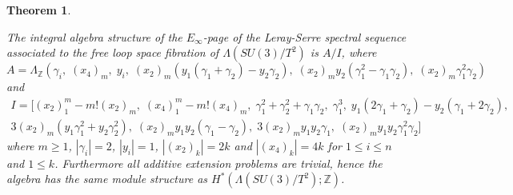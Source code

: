 \documentclass{article}
\theoremstyle{plain}
\newtheorem{thm}{Theorem}[section]
\theoremstyle{definition}
\numberwithin{thm}{section}
\begin{document}
			\begin{thm}\label{thm:L(SU(3)/T^2)}
				
				The integral algebra structure of the $E_\infty$-page of the Leray-Serre spectral sequence associated to the free loop space fibration of $\Lambda(SU(3)/T^2)$
				is $A/I$, where
				\begin{equation*}
					A=\Lambda_{\mathbb{Z}}(\gamma_i,\; (x_4)_m,\; y_i,\; (x_2)_m(y_1(\gamma_1+\gamma_2)-y_2\gamma_2),\; (x_2)_my_2(\gamma_1^2-\gamma_1\gamma_2),\;
					(x_2)_m\gamma_1^2\gamma_2)
				\end{equation*}
				and
				\begin{align*}
					I=[(x_2)_1^m-m!(x_2)_m,\; (x_4)_1^m-m!(x_4)_m,\; \gamma_1^2+\gamma_2^2+\gamma_1\gamma_2,\;
					\gamma_1^3,\; y_1(2\gamma_1+\gamma_2)-y_2(\gamma_1+2\gamma_2),\; \\
					3(x_2)_m(y_1\gamma_1^2+y_2\gamma_2^2),\; (x_2)_my_1y_2(\gamma_1-\gamma_2),\; 3(x_2)_my_1y_2\gamma_1,\; (x_2)_my_1y_2\gamma_1^2\gamma_2]
				\end{align*}
				where $m\geq 1$,
				$|\gamma_i|=2$, $|y_i|=1$, $|(x_2)_k|=2k$ and $|(x_4)_k|=4k$ for $1\leq i \leq n$ and $1\leq k$.
				Furthermore all additive extension problems are trivial, hence the algebra has the same module structure as $H^*(\Lambda(SU(3)/T^{2});\mathbb{Z})$.
			\end{thm}
			
\end{document}
